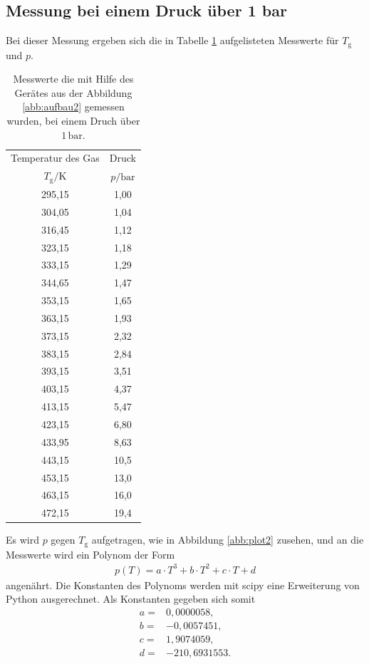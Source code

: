 \subsection{Messung bei einem Druck über 1 bar}
Bei dieser Messung ergeben sich die in Tabelle \ref{tab:p>1} aufgelisteten Messwerte für $T_\mathrm{g}$ und $p$.
\begin{table}   %
  \centering
  \caption{Messwerte die mit Hilfe des Gerätes aus der Abbildung \ref{abb:aufbau2} gemessen wurden, bei einem Druch über $1\,\si{\bar}$.}
  \label{tab:p>1}
  \begin{tabular}{c c}
    \toprule
    Temperatur des Gas &  Druck \\
    $T_\mathrm{g}/ \si{\kelvin}$ & $p/\si{\bar} $ \\
    \midrule
    295,15 & 1,00\\
    304,05 & 1,04\\
    316,45 & 1,12\\
    323,15 & 1,18\\
    333,15 & 1,29\\
    344,65 & 1,47\\
    353,15 & 1,65\\
    363,15 & 1,93\\
    373,15 & 2,32\\
    383,15 & 2,84\\
    393,15 & 3,51\\
    403,15 & 4,37\\
    413,15 & 5,47\\
    423,15 & 6,80\\
    433,95 & 8,63\\
    443,15 & 10,5\\
    453,15 & 13,0\\
    463,15 & 16,0\\
    472,15 & 19,4\\
    \bottomrule
  \end{tabular}
\end{table}
\FloatBarrier
Es wird $p$ gegen $T_\mathrm{g}$ aufgetragen, wie in Abbildung \ref{abb:plot2} zusehen, und an die Messwerte wird ein Polynom
der Form
\begin{align*}
p(T)=a\cdot T^3+b\cdot T^2 + c\cdot T + d
\end{align*}
angenährt.
Die Konstanten des Polynoms werden mit scipy eine Erweiterung von Python ausgerechnet. Als Konstanten gegeben sich somit
\begin{align*}
  a =&0,0000058,\\
  b =&-0,0057451,\\
  c =&1,9074059,\\
  d =&-210,6931553.
\end{align*}
